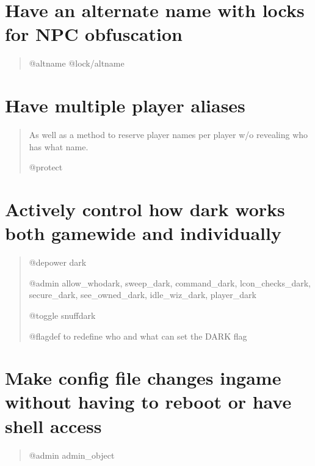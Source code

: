 \documentclass[letterpaper,10pt,english]{sphinxmanual}
\begin{document}
\section{Have an alternate name with locks for NPC obfuscation}
\label{\detokenize{features:have-an-alternate-name-with-locks-for-npc-obfuscation}}\begin{quote}

\sphinxAtStartPar
@altname
@lock/altname
\end{quote}


\section{Have multiple player aliases}
\label{\detokenize{features:have-multiple-player-aliases}}\begin{quote}

\sphinxAtStartPar
As well as a method to reserve player names per player w/o revealing who has what name.

\sphinxAtStartPar
@protect
\end{quote}


\section{Actively control how dark works both game\sphinxhyphen{}wide and individually}
\label{\detokenize{features:actively-control-how-dark-works-both-game-wide-and-individually}}\begin{quote}

\sphinxAtStartPar
@depower dark

\sphinxAtStartPar
@admin allow\_whodark, sweep\_dark, command\_dark, lcon\_checks\_dark,
secure\_dark, see\_owned\_dark, idle\_wiz\_dark, player\_dark

\sphinxAtStartPar
@toggle snuffdark

\sphinxAtStartPar
@flagdef to redefine who and what can set the DARK flag
\end{quote}


\section{Make config file changes in\sphinxhyphen{}game without having to reboot or have shell access}
\label{\detokenize{features:make-config-file-changes-in-game-without-having-to-reboot-or-have-shell-access}}\begin{quote}

\sphinxAtStartPar
@admin admin\_object
\end{quote}
\end{document}
